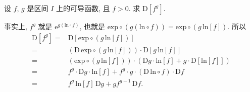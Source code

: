 \begin{example}
    设 $f$, $g$ 是区间 $I$ 上的可导函数, 且 $f > 0$. 求 $\mathrm{D}[f^g]$.

    事实上, $f^g$ 就是 $\mathrm{e}^{g(\mathrm{ln} \circ f)}$, 也就是 $\mathrm{exp} \circ (g(\mathrm{ln} \circ f)) = \mathrm{exp} \circ (g\, \mathrm{ln}[f])$. 所以
    \begin{align*}
        \mathrm{D}[f^g]
        = {} & \mathrm{D}[\mathrm{exp} \circ (g\, \mathrm{ln}[f])]                    \\
        = {} & ({\mathrm{D}\,\mathrm{exp}} \circ (g\, \mathrm{ln}[f]))
        \cdot \mathrm{D}[g\, \mathrm{ln}[f]]                                          \\
        = {} & (\mathrm{exp} \circ (g\, \mathrm{ln}[f]))
        \cdot (\mathrm{D}g \cdot \mathrm{ln}[f] + g \cdot \mathrm{D}[\mathrm{ln}[f]]) \\
        = {} & f^g \cdot \mathrm{D}g \cdot \mathrm{ln}[f]
        + f^g \cdot g \cdot (\mathrm{D}\,\mathrm{ln} \circ f) \cdot \mathrm{D}f       \\
        = {} & f^g \, \mathrm{ln}[f] \, \mathrm{D}g
        + g f^{g - 1}\,\mathrm{D}f.
    \end{align*}
\end{example}

